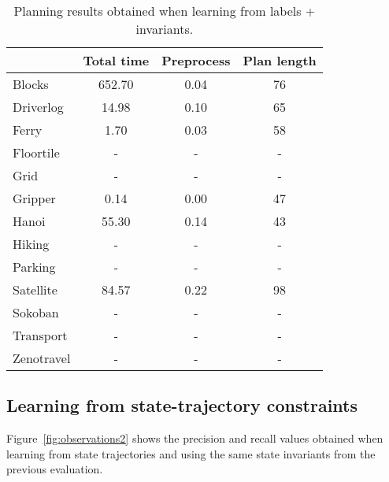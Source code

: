 \documentclass{article}
\begin{document}
\begin{table}
	\begin{footnotesize}
		\begin{center}
			\begin{tabular}{l|c|c|c|}			
				& Total time & Preprocess & Plan length  \\
				\hline
				Blocks & 652.70 & 0.04 & 76  \\
				Driverlog & 14.98 & 0.10 & 65 \\
				Ferry & 1.70 & 0.03 & 58 \\
				Floortile & - & - & - \\ %
				Grid & - & - & - \\ %
				Gripper & 0.14 & 0.00 & 47 \\
				Hanoi & 55.30 & 0.14 & 43  \\
				Hiking & - & - & - \\ %
				Parking & - & - & - \\ %
				Satellite & 84.57 & 0.22 & 98 \\
				Sokoban & - & - & - \\ %
				Transport & - & - & - \\ %
				Zenotravel & - & - & - \\ %
			\end{tabular}
		\end{center}
	\end{footnotesize}	
 \caption{\small Planning results obtained when learning from labels + invariants.}
\label{fig:planinvariants}
\end{table}


\subsection{Learning from state-trajectory constraints}
Figure~\ref{fig:observations2} shows the precision and recall values obtained when learning from state trajectories and using the same state invariants from the previous evaluation.
\end{document}
